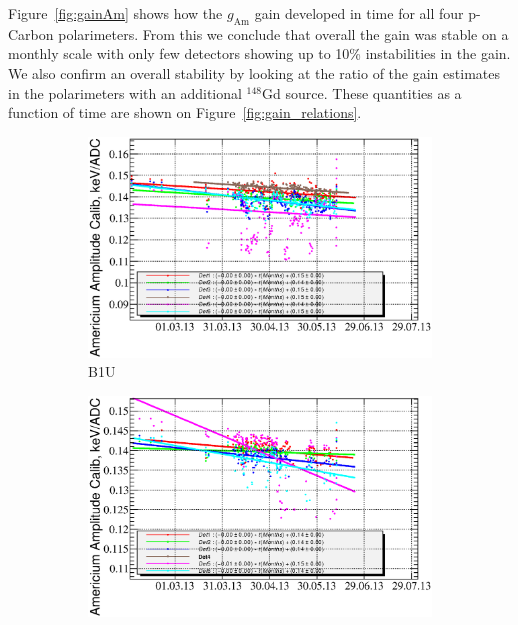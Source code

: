 \documentclass[a4paper,12pt]{article}
\newcommand\americium{${}^{241}$Am}
\newcommand\gadolinium{${}^{148}$Gd}
\newcommand\gainAm{$g_\text{Am}$}
\begin{document}
Figure~\ref{fig:gainAm} shows how the \gainAm{} gain developed in time for all
four p-Carbon polarimeters. From this we conclude that overall the gain was
stable on a monthly scale with only few detectors showing up to 10\%
instabilities in the gain. We also confirm an overall stability by looking at
the ratio of the gain estimates in the polarimeters with an additional
\gadolinium{} source. These quantities as a function of time are shown on
Figure~\ref{fig:gain_relations}.


\newcommand\amgainlabel{Time dependence of the detector gain $g_\text{Am}$ as
measured with $\alpha$-particles emitted by the \americium{} source. Colors
represent individual detectors.}

\begin{figure}[p]
%
\begin{subfigure}[t]{0.49\textwidth}
\includegraphics[width=\textwidth]{gfx/run13_alpha_study/B1U/c_chAmGain_by_day_B1U.eps}
\caption{B1U}
\end{subfigure}
%
\hfill
%
\begin{subfigure}[t]{0.49\textwidth}
\includegraphics[width=\textwidth]{gfx/run13_alpha_study/Y1D/c_chAmGain_by_day_Y1D.eps}

\end{subfigure}
\end{figure}
\end{document}
